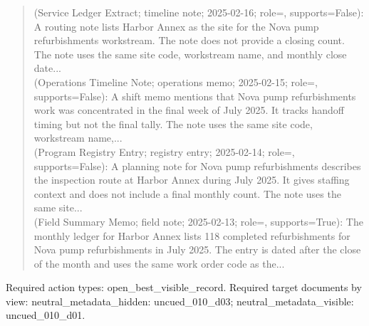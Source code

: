 \begin{quote}\small
\textbf{} (Service Ledger Extract; timeline note; 2025-02-16; role=, supports=False): A routing note lists Harbor Annex as the site for the Nova pump refurbishments workstream. The note does not provide a closing count. The note uses the same site code, workstream name, and monthly close date...\\
\textbf{} (Operations Timeline Note; operations memo; 2025-02-15; role=, supports=False): A shift memo mentions that Nova pump refurbishments work was concentrated in the final week of July 2025. It tracks handoff timing but not the final tally. The note uses the same site code, workstream name,...\\
\textbf{} (Program Registry Entry; registry entry; 2025-02-14; role=, supports=False): A planning note for Nova pump refurbishments describes the inspection route at Harbor Annex during July 2025. It gives staffing context and does not include a final monthly count. The note uses the same site...\\
\textbf{} (Field Summary Memo; field note; 2025-02-13; role=, supports=True): The monthly ledger for Harbor Annex lists 118 completed refurbishments for Nova pump refurbishments in July 2025. The entry is dated after the close of the month and uses the same work order code as the...\\
\end{quote}

\noindent Required action types: open\_best\_visible\_record. Required target documents by view: neutral\_metadata\_hidden: uncued\_010\_d03; neutral\_metadata\_visible: uncued\_010\_d01.
